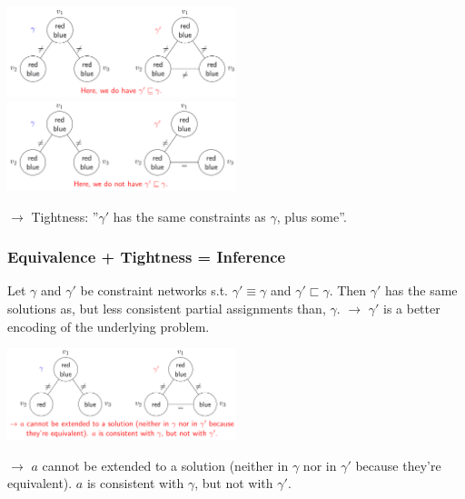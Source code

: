 \documentclass[conference, a4paper]{styles/acmsiggraph}
\begin{document}
            \includegraphics[width=0.5\textwidth]{imgs/TIGHTNESS_1.png}\ \ \ \ \ \ 
            \includegraphics[width=0.5\textwidth]{imgs/TIGHTNESS_2.png}\newline
            
            $\rightarrow$ Tightness: ''$\gamma'$ has the same constraints as $\gamma$, plus some''.
            
        \subsubsection{Equivalence + Tightness = Inference}
            Let $\gamma$ and $\gamma'$ be constraint networks s.t. $\gamma' \equiv \gamma$ and $\gamma' \sqsubset \gamma$.
            Then $\gamma'$ has the same solutions as, but less consistent partial assignments than, $\gamma$.\newline
            $\rightarrow$ $\gamma'$ is a better encoding of the underlying problem.
            
            \includegraphics[width=0.5\textwidth]{imgs/Inference.png}\newline
            
            $\rightarrow$ $a$ cannot be extended to a solution (neither in $\gamma$ nor in $\gamma'$ because they're equivalent).
            $a$ is consistent with $\gamma$, but not with $\gamma'$.
    
    
    
    
    
    
\end{document}
